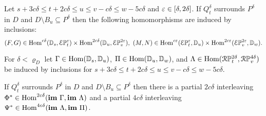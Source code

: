 \begin{lemma}\label{lem:inclusion_hom}
  Let $s + 3c\delta\leq t + 2c\delta\leq u\leq v-c\delta\leq w-5c\delta$ and $\varepsilon\in [\delta,2\delta]$.
  If $Q_{t}^\delta$ surrounds $P^\delta$ in $D$ and $D\setminus B_u\subseteq P^\delta$ then the following homomorphisms are induced by inclusions:
  \[(F, G)\in \mathrm{Hom}^{c\delta}(\mathbb{D}_{s}, \mathcal{E}\mathbb{P}_{t}^{\varepsilon})\times \mathrm{Hom}^{2c\delta}(\mathbb{D}_{u}, \mathcal{E}\mathbb{P}_{v}^{2\varepsilon}),\ (M, N)\in \mathrm{Hom}^{c\varepsilon}(\mathcal{E}\mathbb{P}_{t}^{\varepsilon},\mathbb{D}_{u})\times\mathrm{Hom}^{2c\varepsilon}(\mathcal{E}\mathbb{P}_{v}^{2\varepsilon}, \mathbb{D}_{w}).\]
\end{lemma}

\begin{lemma}\label{lem:partial_interleaving}
  For $\delta < \varrho_D$ let $\Gamma\in\mathrm{Hom}(\mathbb{D}_{s},\mathbb{D}_{u})$, $\Pi\in\mathrm{Hom}(\mathbb{D}_{u},\mathbb{D}_{w})$, and $\Lambda\in\mathrm{Hom}(\mathcal{R}\mathbb{P}_{t}^{2\delta}, \mathcal{R}\mathbb{P}_{v}^{4\delta})$ be induced by inclusions for $s + 3c\delta\leq t + 2c\delta\leq u\leq v-c\delta\leq w-5c\delta$.

  If $Q_{t}^\delta$ surrounds $P^\delta$ in $D$ and $D\setminus B_u\subseteq P^\delta$ then there is a partial $2c\delta$ interleaving $\Phi^*\in\mathrm{Hom}^{2c\delta}(\mathbf{im}~\Gamma, \mathbf{im}~\Lambda)$ and a partial $4c\delta$ interleaving $\Psi^*\in\mathrm{Hom}^{4c\delta}(\mathbf{im}~\Lambda, \mathbf{im}~\Pi)$.
\end{lemma}

